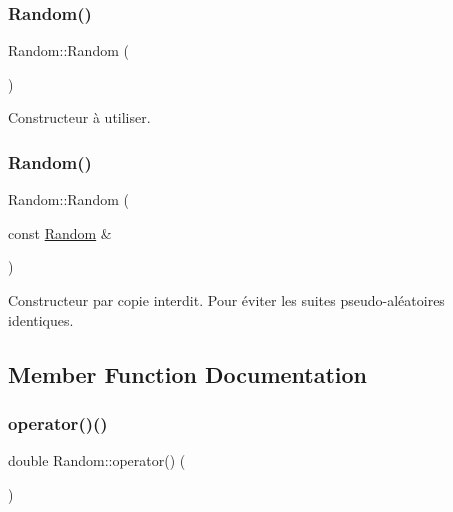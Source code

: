 \subsubsection{\texorpdfstring{Random()}{Random()}\hspace{0.1cm}{\footnotesize\ttfamily [1/2]}}
{\footnotesize\ttfamily Random\+::\+Random (\begin{DoxyParamCaption}{ }\end{DoxyParamCaption})}



Constructeur à utiliser. 

\mbox{\label{classRandom_a9bfadeaa4adc5ac44142d000b1c99441}} 
\subsubsection{\texorpdfstring{Random()}{Random()}\hspace{0.1cm}{\footnotesize\ttfamily [2/2]}}
{\footnotesize\ttfamily Random\+::\+Random (\begin{DoxyParamCaption}\item[{const \hyperlink{classRandom}{Random} \&}]{ }\end{DoxyParamCaption})\hspace{0.3cm}{\ttfamily [delete]}}

Constructeur par copie interdit. Pour éviter les suites pseudo-\/aléatoires identiques. 

\subsection{Member Function Documentation}
\mbox{\label{classRandom_aa0277ecffaf7d920b8ebd2399214f113}} 
\subsubsection{\texorpdfstring{operator()()}{operator()()}\hspace{0.1cm}{\footnotesize\ttfamily [1/2]}}
{\footnotesize\ttfamily double Random\+::operator() (\begin{DoxyParamCaption}{ }\end{DoxyParamCaption})}



